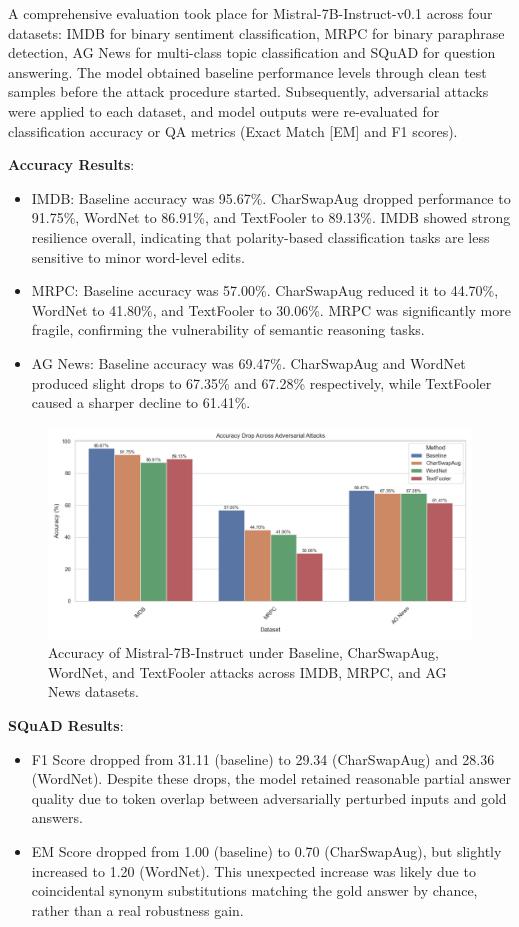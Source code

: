 \documentclass[conference]{IEEEtran}
\begin{document}
A comprehensive evaluation took place for Mistral-7B-Instruct-v0.1 across four datasets: IMDB for binary sentiment classification, MRPC for binary paraphrase detection, AG News for multi-class topic classification and SQuAD for question answering. The model obtained baseline performance levels through clean test samples before the attack procedure started. Subsequently, adversarial attacks were applied to each dataset, and model outputs were re-evaluated for classification accuracy or QA metrics (Exact Match [EM] and F1 scores).

\textbf{Accuracy Results}:
\begin{itemize}
    \item IMDB: Baseline accuracy was 95.67\%. CharSwapAug dropped performance to 91.75\%, WordNet to 86.91\%, and TextFooler to 89.13\%. IMDB showed strong resilience overall, indicating that polarity-based classification tasks are less sensitive to minor word-level edits.
    \item MRPC: Baseline accuracy was 57.00\%. CharSwapAug reduced it to 44.70\%, WordNet to 41.80\%, and TextFooler to 30.06\%. MRPC was significantly more fragile, confirming the vulnerability of semantic reasoning tasks.
    \item AG News: Baseline accuracy was 69.47\%. CharSwapAug and WordNet produced slight drops to 67.35\% and 67.28\% respectively, while TextFooler caused a sharper decline to 61.41\%.
\end{itemize}

\begin{figure}[htbp]
    \centering
    \includegraphics[width=0.9\linewidth]{figures/accuracy_chart_updated.png}
    \caption{Accuracy of Mistral-7B-Instruct under Baseline, CharSwapAug, WordNet, and TextFooler attacks across IMDB, MRPC, and AG News datasets.}
    \label{fig:accuracy}
\end{figure}

\textbf{SQuAD Results}:
\begin{itemize}
    \item F1 Score dropped from 31.11 (baseline) to 29.34 (CharSwapAug) and 28.36 (WordNet). Despite these drops, the model retained reasonable partial answer quality due to token overlap between adversarially perturbed inputs and gold answers.
    \item EM Score dropped from 1.00 (baseline) to 0.70 (CharSwapAug), but slightly increased to 1.20 (WordNet). This unexpected increase was likely due to coincidental synonym substitutions matching the gold answer by chance, rather than a real robustness gain.
\end{itemize}
\end{document}
